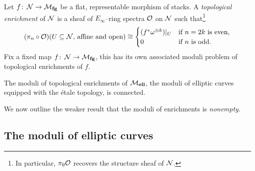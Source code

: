 \begin{definition}
Let \(f\colon\thinspace \mathcal{N} \to \mathcal{M}_{\mathbf{fg}}\) be a flat, representable morphism of stacks.  A \textit{topological enrichment} of \(\mathcal{N}\) is a sheaf of \(E_\infty\)--ring spectra \(\mathcal{O}\) on \(\mathcal{N}\) such that\footnote{In particular, \(\pi_0 \mathcal{O}\) recovers the structure sheaf of \(\mathcal{N}\).} \[(\pi_n \circ \mathcal{O})(\text{\(U \subseteq \mathcal{N}\), affine and open}) \cong \begin{cases} (f^* \omega^{\otimes k})|_U & \text{if \(n = 2k\) is even}, \\ 0 & \text{if \(n\) is odd}. \end{cases}\]  Fix a fixed map \(f\colon\thinspace \mathcal{N} \to \mathcal{M}_{\mathbf{fg}}\), this has its own associated moduli problem of topological enrichments of \(f\).
\end{definition}

\begin{theorem}\label{UniqueTopEnrichmentOfMell}
The moduli of topological enrichments of \(\mathcal{M}_{\mathbf{ell}}\), the moduli of elliptic curves equipped with the \'etale topology, is connected.
\end{theorem}

\noindent We now outline the weaker result that the moduli of enrichments is \emph{nonempty}.



\subsection*{The moduli of elliptic curves}

